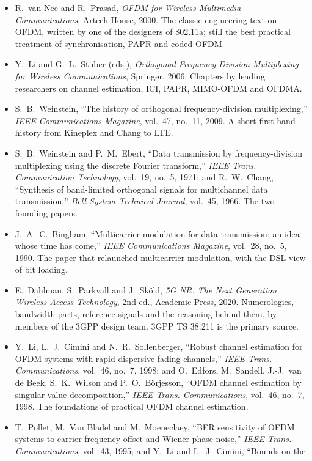 \furtherreading
\begin{itemize}
\item R.~van Nee and R.~Prasad, \emph{OFDM for Wireless Multimedia Communications}, Artech House, 2000. The classic
engineering text on OFDM, written by one of the designers of 802.11a; still the best practical treatment of
synchronisation, PAPR and coded OFDM.
\item Y.~Li and G.~L.~St\"uber (eds.), \emph{Orthogonal Frequency Division Multiplexing for Wireless Communications},
Springer, 2006. Chapters by leading researchers on channel estimation, ICI, PAPR, MIMO-OFDM and OFDMA.
\item S.~B.~Weinstein, ``The history of orthogonal frequency-division multiplexing,'' \emph{IEEE Communications
Magazine}, vol.~47, no.~11, 2009. A short first-hand history from Kineplex and Chang to LTE.
\item S.~B.~Weinstein and P.~M.~Ebert, ``Data transmission by frequency-division multiplexing using the discrete
Fourier transform,'' \emph{IEEE Trans. Communication Technology}, vol.~19, no.~5, 1971; and R.~W.~Chang, ``Synthesis
of band-limited orthogonal signals for multichannel data transmission,'' \emph{Bell System Technical Journal},
vol.~45, 1966. The two founding papers.
\item J.~A.~C.~Bingham, ``Multicarrier modulation for data transmission: an idea whose time has come,'' \emph{IEEE
Communications Magazine}, vol.~28, no.~5, 1990. The paper that relaunched multicarrier modulation, with the DSL view
of bit loading.
\item E.~Dahlman, S.~Parkvall and J.~Sk\"old, \emph{5G NR: The Next Generation Wireless Access Technology}, 2nd ed.,
Academic Press, 2020. Numerologies, bandwidth parts, reference signals and the reasoning behind them, by
members of the 3GPP design team. 3GPP TS 38.211 is the primary source.
\item Y.~Li, L.~J.~Cimini and N.~R.~Sollenberger, ``Robust channel estimation for OFDM systems with rapid dispersive
fading channels,'' \emph{IEEE Trans. Communications}, vol.~46, no.~7, 1998; and O.~Edfors, M.~Sandell, J.-J.~van de
Beek, S.~K.~Wilson and P.~O.~B\"orjesson, ``OFDM channel estimation by singular value decomposition,'' \emph{IEEE Trans.
Communications}, vol.~46, no.~7, 1998. The foundations of practical OFDM channel estimation.
\item T.~Pollet, M.~Van Bladel and M.~Moeneclaey, ``BER sensitivity of OFDM systems to carrier frequency offset and
Wiener phase noise,'' \emph{IEEE Trans. Communications}, vol.~43, 1995; and Y.~Li and L.~J.~Cimini, ``Bounds on the

\end{itemize}
